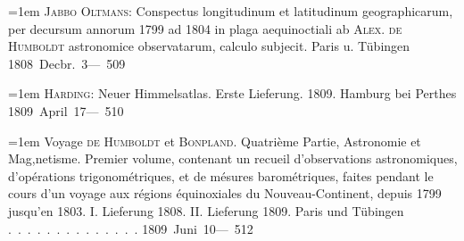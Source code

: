 \noindent\hangindent=1em \textsc{Jabbo Oltmans}: Conspectus longitudinum et latitudinum geographicarum, per decursum annorum 1799 ad 1804 in plaga aequinoctiali ab \textsc{Alex. de Humboldt} astronomice observatarum, calculo subjecit. Paris u. Tübingen  \hfill\mbox{1808 Decbr. 3}\quad\mbox{--- 509}\par\smallskip
\noindent\hangindent=1em \textsc{Harding}: Neuer Himmelsatlas. Erste Lieferung. 1809. Hamburg bei Perthes  \hfill\mbox{1809 April 17}\quad\mbox{--- 510}\par\smallskip
\noindent\hangindent=1em Voyage \textsc{de Humboldt} et \textsc{Bonpland}. Quatrième Partie, Astronomie et Mag,netisme. Premier volume, contenant un recueil d'observations astronomiques, d'opérations trigonométriques, et de mésures barométriques, faites pendant le cours d'un voyage aux régions équinoxiales du Nouveau-Continent, depuis 1799 jusqu'en 1803. I. Lieferung 1808. II. Lieferung 1809. Paris und Tübingen \mbox{.\ .\ .\ .\ .\ .\ .\ .\ .\ .\ .\ .\ .\ .} \hfill\mbox{1809 Juni 10}\quad\mbox{--- 512}\par\smallskip
\endgroup
